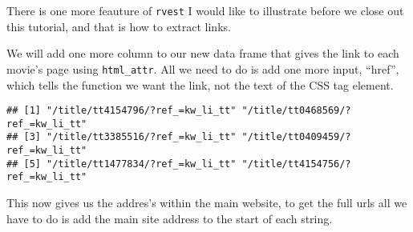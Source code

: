 \documentclass[]{article}
\newenvironment{Shaded}{\begin{snugshade}}{\end{snugshade}}
\newcommand{\KeywordTok}[1]{\textcolor[rgb]{0.13,0.29,0.53}{\textbf{#1}}}
\newcommand{\NormalTok}[1]{#1}
\newcommand{\OperatorTok}[1]{\textcolor[rgb]{0.81,0.36,0.00}{\textbf{#1}}}
\newcommand{\StringTok}[1]{\textcolor[rgb]{0.31,0.60,0.02}{#1}}
\begin{document}
There is one more feauture of \texttt{rvest} I would like to illustrate
before we close out this tutorial, and that is how to extract links.

We will add one more column to our new data frame that gives the link to
each movie's page using \texttt{html\_attr}. All we need to do is add
one more input, ``href'', which tells the function we want the link, not
the text of the CSS tag element.

\begin{Shaded}
\end{Shaded}

\begin{verbatim}
## [1] "/title/tt4154796/?ref_=kw_li_tt" "/title/tt0468569/?ref_=kw_li_tt"
## [3] "/title/tt3385516/?ref_=kw_li_tt" "/title/tt0409459/?ref_=kw_li_tt"
## [5] "/title/tt1477834/?ref_=kw_li_tt" "/title/tt4154756/?ref_=kw_li_tt"
\end{verbatim}

This now gives us the addres's within the main website, to get the full
urls all we have to do is add the main site address to the start of each
string.

\begin{Shaded}
\end{Shaded}
\end{document}
